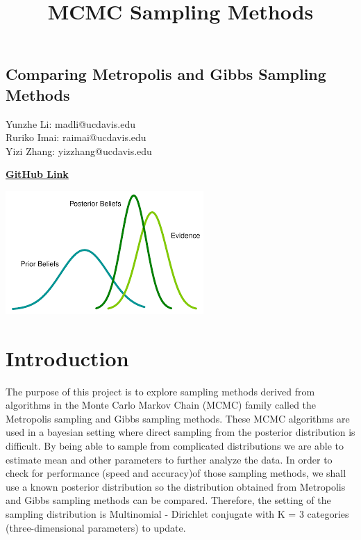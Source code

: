 \documentclass[11pt,a4paper]{article}
\begin{document}
\title{MCMC Sampling Methods}
\pagestyle{fancy}

{
\fancyhf{}
\cfoot{\thepage}
}

\vspace*{\fill}
\begin{center}
\subsection*{ 
\huge Comparing Metropolis and Gibbs Sampling Methods
}
\end{center}

\begin{center}
Yunzhe Li: madli@ucdavis.edu \\
Ruriko Imai: raimai@ucdavis.edu \\
Yizi Zhang: yizzhang@ucdavis.edu
\end{center}

\begin{center}
\href{https://github.com/imaination/Bayesian}{\textbf{GitHub Link}}
\end{center}

\bigskip
\bigskip
\bigskip
\bigskip
\bigskip
\bigskip
\bigskip
\bigskip
\bigskip
\bigskip
\bigskip
\bigskip


\begin{center}
\includegraphics[scale=1.5]{images/cover.png}
\end{center}
\vspace*{\fill}
\newpage


\section*{Introduction}
The purpose of this project is to explore sampling methods derived from algorithms in the Monte Carlo Markov Chain (MCMC) family called the Metropolis sampling and Gibbs sampling methods. These MCMC algorithms are used in a bayesian setting where direct sampling from the posterior distribution is difficult. By being able to sample from complicated distributions we are able to estimate mean and other parameters to further analyze the data. In order to check for performance (speed and accuracy)of those sampling methods, we shall use a known posterior distribution so the distribution obtained from Metropolis and Gibbs sampling methods can be compared. Therefore, the setting of the sampling distribution is Multinomial - Dirichlet conjugate with K = 3 categories (three-dimensional parameters) to update. 
\end{document}
